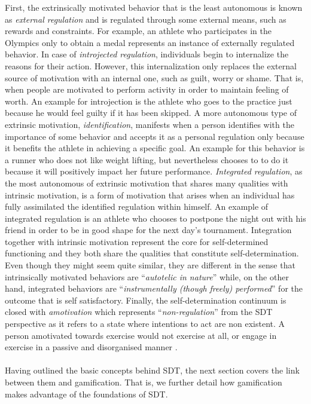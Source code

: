 First, the extrinsically motivated behavior that is the least autonomous is known as \textit{external regulation} and is regulated through some external means, such as rewards and constraints. For example, an athlete who participates in the Olympics only to obtain a medal represents an instance of externally regulated behavior. In case of \textit{introjected regulation}, individuals begin to internalize the reasons for their action. However, this internalization only replaces the external source of motivation with an internal one, such as guilt, worry or shame. That is, when people are motivated to perform activity in order to maintain feeling of worth. An example for introjection is the athlete who goes to the practice just because he would feel guilty if it has been skipped. A more autonomous type of extrinsic motivation, \textit{identification}, manifests when a person identifies with the importance of some behavior and accepts it as a personal regulation only because it benefits the athlete in achieving a specific goal. An example for this behavior is a runner who does not like weight lifting, but nevertheless chooses to to do it because it will positively impact her future performance. \textit{Integrated regulation}, as the most autonomous of extrinsic motivation that shares many qualities with intrinsic motivation, is a form of motivation that arises when an individual has fully assimilated the identified regulation within himself. An example of integrated regulation is an athlete who chooses to postpone the night out with his friend in order to be in good shape for the next day's tournament. Integration together with intrinsic motivation represent the core for self-determined functioning and they both share the qualities that constitute self-determination. Even though they might seem quite similar, they are different in the sense that intrinsically motivated behaviors are ``\textit{autotelic in nature}'' while, on the other hand, integrated behaviors are ``\textit{instrumentally (though freely) performed}'' for the outcome that is self satisfactory.  Finally, the self-determination continuum is closed with  \textit{amotivation} which represents ``\textit{non-regulation}'' from the SDT perspective as it refers to a state where intentions to act are non existent. A person amotivated towards exercise would not exercise at all, 
or engage in exercise in a passive and disorganised  manner \cite{vallerand2007intrinsic, ryan2000intrinsic, deci1994promoting}.\\\\
Having outlined the basic concepts behind SDT, the next section covers the link between them and gamification. That is, we further detail how gamification makes advantage of the foundations of SDT.
